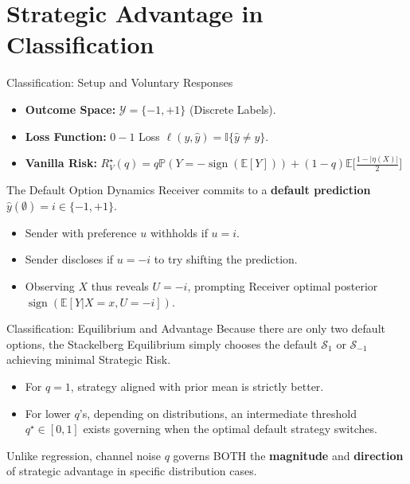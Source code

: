 \documentclass[10pt, aspectratio=169]{beamer}
\newcommand{\E}{\mathbb{E}}
\newcommand{\Prob}{\mathbb{P}}
\DeclareMathOperator{\sgn}{sign}
\newcommand{\Ind}[1]{\mathbb{I}\{#1\}}
\newcommand{\cY}{\mathcal{Y}}
\newcommand{\cS}{\mathcal{S}}
\begin{document}
\section{Strategic Advantage in Classification}

\begin{frame}{Classification: Setup and Voluntary Responses}
    \begin{itemize}
        \item \textbf{Outcome Space:} $\cY = \{-1,+1\}$ (Discrete Labels).
        \item \textbf{Loss Function:} $0-1$ Loss $\ell(y, \hat{y}) = \Ind{\hat{y} \neq y}$.
        \item \textbf{Vanilla Risk:} $R_V^\star(q) = q\Prob(Y=-\sgn(\E[Y])) + (1-q)\E\Big[\frac{1-|\eta(X)|}{2}\Big]$
    \end{itemize}

    \begin{block}{The Default Option Dynamics}
        Receiver commits to a \textbf{default prediction} $\hat{y}(\emptyset) = i \in \{-1, +1\}$.
        \begin{itemize}
            \item Sender with preference $u$ withholds if $u = i$.
            \item Sender discloses if $u = -i$ to try shifting the prediction.
            \item Observing $X$ thus reveals $U = -i$, prompting Receiver optimal posterior $\sgn(\E[Y|X=x, U=-i])$.
        \end{itemize}
    \end{block}
\end{frame}

\begin{frame}{Classification: Equilibrium and Advantage}
    Because there are only two default options, the Stackelberg Equilibrium simply chooses the default $\cS_1$ or $\cS_{-1}$ achieving minimal Strategic Risk.
    
    \begin{theorem}
    \begin{itemize}
        \item For $q=1$, strategy aligned with prior mean is strictly better.
        \item For lower $q$'s, depending on distributions, an intermediate threshold $q^\star \in [0,1]$ exists governing when the optimal default strategy switches.
    \end{itemize}
    Unlike regression, channel noise $q$ governs BOTH the \textbf{magnitude} and \textbf{direction} of strategic advantage in specific distribution cases.
    \end{theorem}
\end{frame}
\end{document}
